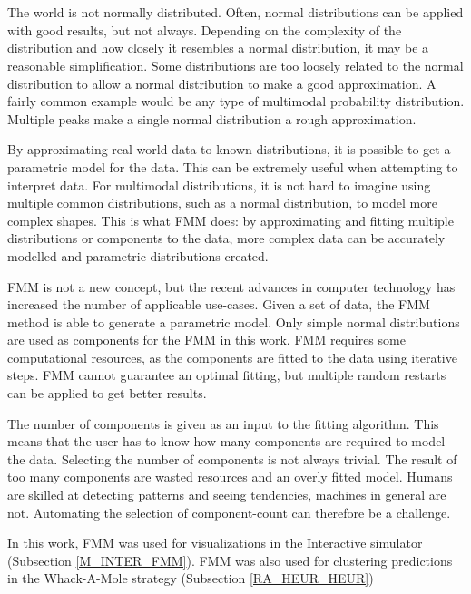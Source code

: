 \documentclass[10pt,a4paper]{book}
\begin{document}
\section{}


The world is not normally distributed. Often, normal distributions can be applied with good results, but not always. Depending on the complexity of the distribution and how closely it resembles a normal distribution, it may be a reasonable simplification. Some distributions are too loosely related to the normal distribution to allow a normal distribution to make a good approximation. A fairly common example would be any type of multimodal probability distribution. Multiple peaks make a single normal distribution a rough approximation. 

By approximating real-world data to known distributions, it is possible to get a parametric model for the data. This can be extremely useful when attempting to interpret data. For multimodal distributions, it is not hard to imagine using multiple common distributions, such as a normal distribution, to model more complex shapes. This is what \gls{FMM} \cite{mclachlan2004finite} does: by approximating and fitting multiple distributions or components to the data, more complex data can be accurately modelled and parametric distributions created.

\gls{FMM} is not a new concept, but the recent advances in computer technology has increased the number of applicable use-cases. Given a set of data, the \gls{FMM} method is able to generate a parametric model. Only simple normal distributions are used as components for the \gls{FMM} in this work. \gls{FMM} requires some computational resources, as the components are fitted to the data using iterative steps. \gls{FMM} cannot guarantee an optimal fitting, but multiple random restarts can be applied to get better results. 

The number of components is given as an input to the fitting algorithm. This means that the user has to know how many components are required to model the data. Selecting the number of components is not always trivial. The result of too many components are wasted resources and an overly fitted model. Humans are skilled at detecting patterns and seeing tendencies, machines in general are not. Automating the selection of component-count can therefore be a challenge.

In this work, \gls{FMM} was used for visualizations in the Interactive simulator (Subsection \ref{M_INTER_FMM}). \Gls{FMM} was also used for clustering predictions in the Whack-A-Mole strategy (Subsection \ref{RA_HEUR_HEUR})
\end{document}
